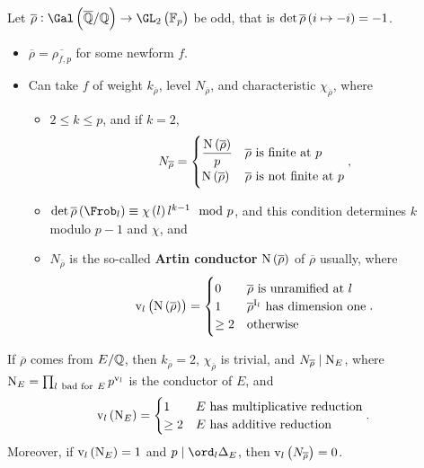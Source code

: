 \begin{theorem}
Let $ \overline{\rho} : \Gal\br{\overline{\QQ} / \QQ} \to \GL_2\br{\FF_p} $ be odd, that is $ \det \overline{\rho}\br{i \mapsto -i} = -1 $.
\begin{itemize}
\item $ \overline{\rho} = \overline{\rho_{f, p}} $ for some newform $ f $.
\item Can take $ f $ of weight $ k_{\overline{\rho}} $, level $ N_{\overline{\rho}} $, and characteristic $ \chi_{\overline{\rho}} $, where
\begin{itemize}
\item $ 2 \le k \le p $, and if $ k = 2 $,
$$
N_{\overline{\rho}} =
\begin{cases}
\dfrac{\N\br{\overline{\rho}}}{p} & \overline{\rho} \ \text{is finite at} \ p \\
\N\br{\overline{\rho}} & \overline{\rho} \ \text{is not finite at} \ p
\end{cases},
$$
\item $ \det \overline{\rho}\br{\Frob_l} \equiv \chi\br{l}l^{k - 1} \mod p $, and this condition determines $ k $ modulo $ p - 1 $ and $ \chi $, and
\item $ N_{\overline{\rho}} $ is the so-called \textbf{Artin conductor} $ \N\br{\overline{\rho}} $ of $ \overline{\rho} $ usually, where
$$
\v_l\br{\N\br{\overline{\rho}}} =
\begin{cases}
0 & \overline{\rho} \ \text{is unramified at} \ l \\
1 & \overline{\rho}^{\I_l} \ \text{has dimension one} \\
\ge 2 & \text{otherwise}
\end{cases}.
$$
\end{itemize}
\end{itemize}
\end{theorem}

\begin{example*}
If $ \overline{\rho} $ comes from $ E / \mathbb{Q} $, then $ k_{\overline{\rho}} = 2 $, $ \chi_{\overline{\rho}} $ is trivial, and $ N_{\overline{\rho}} \mid \mathrm{N}_E $, where $ \N_E = \prod_{l \ \text{bad for} \ E} p^{\v_l} $ is the conductor of $ E $, and
$$ \v_l\br{\N_E} =
\begin{cases}
1 & E \ \text{has multiplicative reduction} \\
\ge 2 & E \ \text{has additive reduction}
\end{cases}.
$$
Moreover, if $ \v_l\br{\N_E} = 1 $ and $ p \mid \ord_l \Delta_E $, then $ \v_l\br{N_{\overline{\rho}}} = 0 $.
\end{example*}

